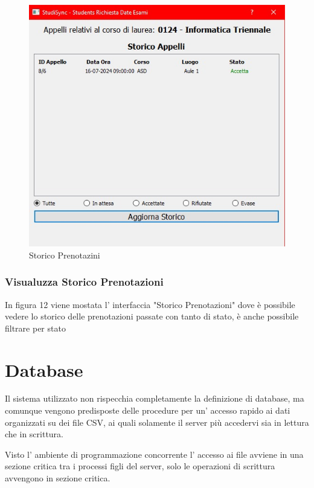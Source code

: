 \documentclass{article}
\begin{document}
\newpage
\begin{figure}
    \centering
    \includegraphics[width=1\linewidth]{IMG/storico_prenotazioni.jpg}
    \caption{Storico Prenotazini}
    \label{fig:enter-label}
\end{figure}

\subsubsection{Visualuzza Storico Prenotazioni}
In figura 12 viene mostata l' interfaccia "Storico Prenotazioni" dove è possibile vedere lo storico delle prenotazioni passate con tanto di stato, è anche possibile filtrare per stato


\section{Database}
Il sistema utilizzato non rispecchia completamente la definizione di database, ma comunque vengono predisposte delle procedure per un' accesso rapido ai dati organizzati su dei file CSV, ai quali solamente il server più accedervi sia in lettura che in scrittura.

Visto l' ambiente di programmazione concorrente l' accesso ai file avviene in una sezione critica tra i processi figli del server, solo le operazioni di scrittura avvengono in sezione critica.
\end{document}
